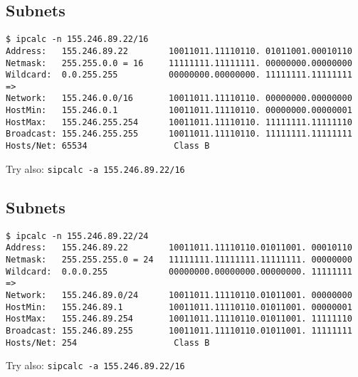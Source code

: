 \documentclass[xga]{xdvislides}
\begin{document}
\subsection{Subnets}
\begin{verbatim}
$ ipcalc -n 155.246.89.22/16
Address:   155.246.89.22        10011011.11110110. 01011001.00010110
Netmask:   255.255.0.0 = 16     11111111.11111111. 00000000.00000000
Wildcard:  0.0.255.255          00000000.00000000. 11111111.11111111
=>
Network:   155.246.0.0/16       10011011.11110110. 00000000.00000000
HostMin:   155.246.0.1          10011011.11110110. 00000000.00000001
HostMax:   155.246.255.254      10011011.11110110. 11111111.11111110
Broadcast: 155.246.255.255      10011011.11110110. 11111111.11111111
Hosts/Net: 65534                 Class B
\end{verbatim}
\vspace{.5in}
Try also: \verb+sipcalc -a 155.246.89.22/16+

\subsection{Subnets}
\begin{verbatim}
$ ipcalc -n 155.246.89.22/24
Address:   155.246.89.22        10011011.11110110.01011001. 00010110
Netmask:   255.255.255.0 = 24   11111111.11111111.11111111. 00000000
Wildcard:  0.0.0.255            00000000.00000000.00000000. 11111111
=>
Network:   155.246.89.0/24      10011011.11110110.01011001. 00000000
HostMin:   155.246.89.1         10011011.11110110.01011001. 00000001
HostMax:   155.246.89.254       10011011.11110110.01011001. 11111110
Broadcast: 155.246.89.255       10011011.11110110.01011001. 11111111
Hosts/Net: 254                   Class B
\end{verbatim}
\vspace{.5in}
Try also: \verb+sipcalc -a 155.246.89.22/16+
\end{document}
